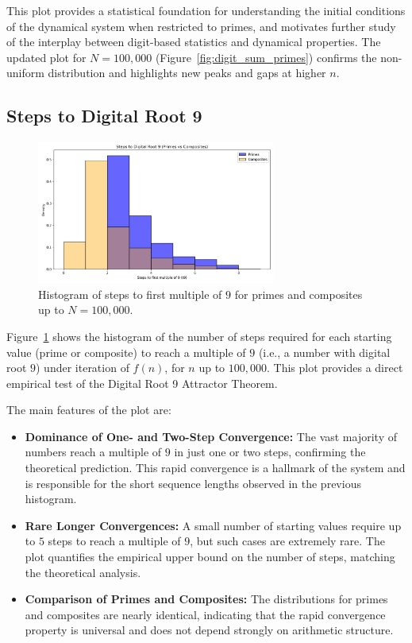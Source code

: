 \documentclass[12pt]{article}
\begin{document}
This plot provides a statistical foundation for understanding the initial conditions of the dynamical system when restricted to primes, and motivates further study of the interplay between digit-based statistics and dynamical properties. The updated plot for $N=100,000$ (Figure~\ref{fig:digit_sum_primes}) confirms the non-uniform distribution and highlights new peaks and gaps at higher $n$.

\subsection{Steps to Digital Root 9}
\begin{figure}[H]
    \centering
    \includegraphics[width=0.7\textwidth]{fig_steps_to_droot9.png}
    \caption{Histogram of steps to first multiple of $9$ for primes and composites up to $N=100,000$.}
    \label{fig:steps_to_droot9}
\end{figure}

Figure~\ref{fig:steps_to_droot9} shows the histogram of the number of steps required for each starting value (prime or composite) to reach a multiple of $9$ (i.e., a number with digital root $9$) under iteration of $f(n)$, for $n$ up to $100,000$. This plot provides a direct empirical test of the Digital Root 9 Attractor Theorem.

The main features of the plot are:
\begin{itemize}
    \item \textbf{Dominance of One- and Two-Step Convergence:} The vast majority of numbers reach a multiple of $9$ in just one or two steps, confirming the theoretical prediction. This rapid convergence is a hallmark of the system and is responsible for the short sequence lengths observed in the previous histogram.
    \item \textbf{Rare Longer Convergences:} A small number of starting values require up to $5$ steps to reach a multiple of $9$, but such cases are extremely rare. The plot quantifies the empirical upper bound on the number of steps, matching the theoretical analysis.
    \item \textbf{Comparison of Primes and Composites:} The distributions for primes and composites are nearly identical, indicating that the rapid convergence property is universal and does not depend strongly on arithmetic structure.
\end{itemize}
\end{document}
